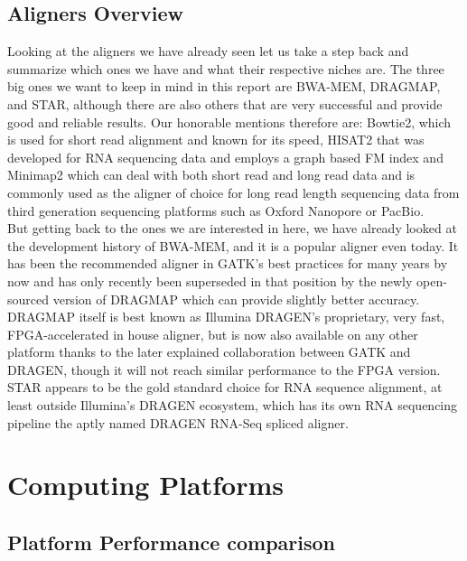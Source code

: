 \documentclass[conference]{IEEEtran}
\begin{document}
\subsection{Aligners Overview}
Looking at the aligners we have already seen let us take a step back and summarize which ones we have and what their respective niches are. The three big ones we want to keep in mind in this report are BWA-MEM, DRAGMAP, and STAR, although there are also others that are very successful and provide good and reliable results. Our honorable mentions therefore are: Bowtie2, which is used for short read alignment and known for its speed, HISAT2 that was developed for RNA sequencing data and employs a graph based FM index and Minimap2 which can deal with both short read and long read data and is commonly used as the aligner of choice for long read length sequencing data from third generation sequencing platforms such as Oxford Nanopore or PacBio. \\
But getting back to the ones we are interested in here, we have already looked at the development history of BWA-MEM, and it is a popular aligner even today. It has been the recommended aligner in GATK's best practices for many years by now and has only recently been superseded in that position by the newly open-sourced version of DRAGMAP which can provide slightly better accuracy. DRAGMAP itself is best known as Illumina DRAGEN's proprietary, very fast, FPGA-accelerated in house aligner, but is now also available on any other platform thanks to the later explained collaboration between GATK and DRAGEN, though it will not reach similar performance to the FPGA version. \\
STAR appears to be the gold standard choice for RNA sequence alignment, at least outside Illumina's DRAGEN ecosystem, which has its own RNA sequencing pipeline the aptly named DRAGEN RNA-Seq spliced aligner. 

\section{Computing Platforms}

\subsection{Platform Performance comparison}
\end{document}
